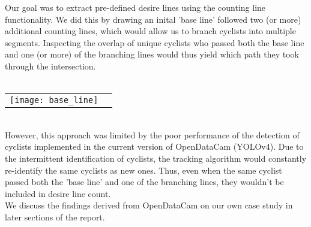 Our goal was to extract pre-defined desire lines using the counting line functionality. We did this by drawing an inital 
'base line' followed two (or more) additional counting lines, which would allow us to branch cyclists into multiple segments. Inspecting the
overlap of unique cyclists who passed both the base line and one (or more) of the branching lines would thus yield which path
they took through the intersection. 
\ \\

\ \\
\raggedbottom
\noindent
\begin{tabular}{@{}cc}
\texttt{[image: base\_line]} 
\end{tabular}
\ \\

However, this approach was limited by the poor performance of the detection of cyclists implemented in the current 
version of OpenDataCam (YOLOv4). Due to the intermittent identification of cyclists, the tracking algorithm would constantly 
re-identify the same cyclists as new ones. Thus, even when the same cyclist passed both the 'base line' and one of the 
branching lines, they wouldn't be included in desire line count.
\ \\

We discuss the findings derived from OpenDataCam on our own case study in later sections of the report.